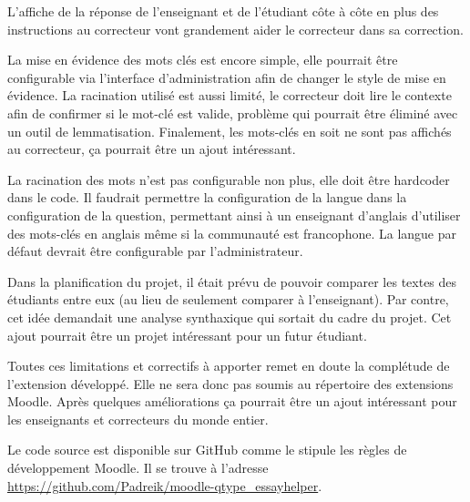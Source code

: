 \begin{conclusion}

L'affiche de la réponse de l'enseignant et de l'étudiant côte à côte en plus des instructions au correcteur vont grandement aider le correcteur dans sa correction.

La mise en évidence des mots clés est encore simple, elle pourrait être configurable via l'interface d'administration afin de changer le style de mise en évidence. La racination utilisé est aussi limité, le correcteur doit lire le contexte afin de confirmer si le mot-clé est valide, problème qui pourrait être éliminé avec un outil de lemmatisation. Finalement, les mots-clés en soit ne sont pas affichés au correcteur, ça pourrait être un ajout intéressant.

La racination des mots n'est pas configurable non plus, elle doit être \og hardcoder \fg{} dans le code. Il faudrait permettre la configuration de la langue dans la configuration de la question, permettant ainsi à un enseignant d'anglais d'utiliser des mots-clés en anglais même si la communauté est francophone. La langue par défaut devrait être configurable par l'administrateur.

Dans la planification du projet, il était prévu de pouvoir comparer les textes des étudiants entre eux (au lieu de seulement comparer à l'enseignant). Par contre, cet idée demandait une analyse synthaxique qui sortait du cadre du projet. Cet ajout pourrait être un projet intéressant pour un futur étudiant.

Toutes ces limitations et correctifs à apporter remet en doute la complétude de l'extension développé. Elle ne sera donc pas soumis au répertoire des extensions Moodle. Après quelques améliorations ça pourrait être un ajout intéressant pour les enseignants et correcteurs du monde entier.

Le code source est disponible sur GitHub comme le stipule les règles de développement Moodle. Il se trouve à l'adresse \url{https://github.com/Padreik/moodle-qtype_essayhelper}.

\end{conclusion}